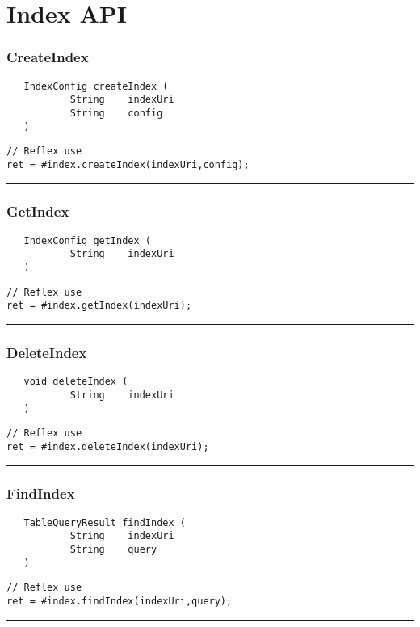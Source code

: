 \section{Index API}

\subsubsection{CreateIndex}
\label{Api:CreateIndex}
\begin{verbatim}
   IndexConfig createIndex (
           String    indexUri
           String    config
   )
\end{verbatim}
\begin{lstlisting}[language=reflex]
// Reflex use
ret = #index.createIndex(indexUri,config);
\end{lstlisting}



\rule{15cm}{2pt}
\subsubsection{GetIndex}
\label{Api:GetIndex}
\begin{verbatim}
   IndexConfig getIndex (
           String    indexUri
   )
\end{verbatim}
\begin{lstlisting}[language=reflex]
// Reflex use
ret = #index.getIndex(indexUri);
\end{lstlisting}



\rule{15cm}{2pt}
\subsubsection{DeleteIndex}
\label{Api:DeleteIndex}
\begin{verbatim}
   void deleteIndex (
           String    indexUri
   )
\end{verbatim}
\begin{lstlisting}[language=reflex]
// Reflex use
ret = #index.deleteIndex(indexUri);
\end{lstlisting}



\rule{15cm}{2pt}
\subsubsection{FindIndex}
\label{Api:FindIndex}
\begin{verbatim}
   TableQueryResult findIndex (
           String    indexUri
           String    query
   )
\end{verbatim}
\begin{lstlisting}[language=reflex]
// Reflex use
ret = #index.findIndex(indexUri,query);
\end{lstlisting}



\rule{15cm}{2pt}
